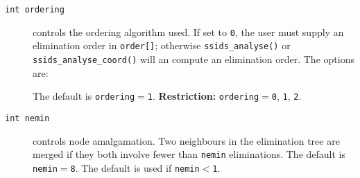 \begin{description}

\item[\texttt{int ordering}] controls the ordering algorithm used. 
If set to {\tt 0}, the user
must supply an elimination order in {\tt order[]}; otherwise
{\tt ssids\_analyse()} or {\tt ssids\_analyse\_coord()} will an compute an
elimination order.
The options are:
The default is {\tt ordering}$=${\tt 1}.
{\bf Restriction:} {\tt ordering}$=${\tt 0}, {\tt 1}, {\tt 2}.

\item[\texttt{int nemin}] controls
node amalgamation. Two neighbours in the elimination tree are merged
if they both involve fewer than {\tt nemin} eliminations.
The default is {\tt nemin$=$8}.
The default is used if {\tt nemin$<$1}.
\end{description}

